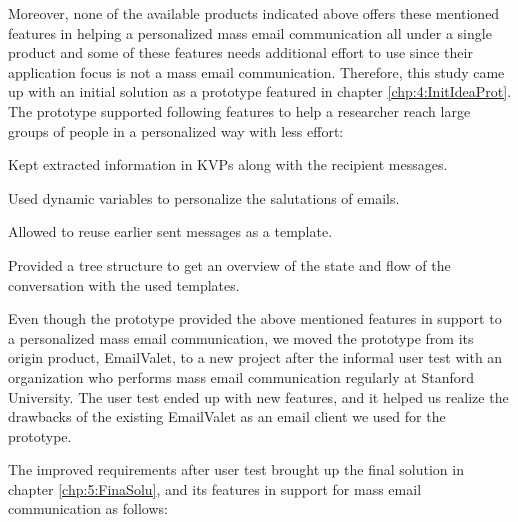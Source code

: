 Moreover, none of the available products indicated above offers these mentioned features in helping a personalized mass email communication all under a single product and some of these features needs additional effort to use since their application focus is not a mass email communication. Therefore, this study came up with an initial solution as a prototype featured in chapter \ref{chp:4:InitIdeaProt}. The prototype supported following features to help a researcher reach large groups of people in a personalized way with less effort:

\begin{compactitem}
	\item Kept extracted information in \ac{KVP}s along with the recipient messages.
	\item Used dynamic variables to personalize the salutations of emails.
	\item Allowed to reuse earlier sent messages as a template.
	\item Provided a tree structure to get an overview of the state and flow of the conversation with the used templates.
\end{compactitem}
\vspace{1cm}

Even though the prototype provided the above mentioned features in support to a personalized mass email communication, we moved the prototype from its origin product, EmailValet, to a new project after the informal user test with an organization who performs mass email communication regularly at Stanford University. The user test ended up with new features, and it helped us realize the drawbacks of the existing EmailValet as an email client we used for the prototype.
\vspace{1cm}

The improved requirements after user test brought up the final solution in chapter \ref{chp:5:FinaSolu}, and its features in support for mass email communication as follows:

